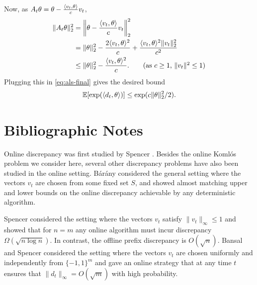 Now, as $A_t \theta = \theta - \frac{\langle v_t,\theta\rangle}{c} v_t$, 
\begin{align*}
    \|A_t \theta \|_2^2  & =  \left\| \theta -  \frac{ \langle v_t,\theta \rangle}{c} v_t \right\|_2^2 \\
    & =  \|\theta\|_2^2 - \frac{2   \langle v_t,\theta \rangle^2}{c} +\frac{\langle v_t,\theta \rangle^2 \|v_t\|_2^2}{c^2} \\
    & \leq  \|\theta\|_2^2 -   \frac{\langle v_t,\theta \rangle^2}{c}.  \tag{as $c \geq 1$, $\|v_t\|^2 \leq 1$}
\end{align*}
Plugging this in \eqref{eq:als-final} gives the desired bound 
\[
 \mathbb{E} [\exp(\langle d_t,\theta \rangle)]  
 \leq \exp ( c \|\theta \|_2^2/2).\]




\section{Bibliographic Notes} 
 Online discrepancy was first studied by Spencer \cite{Spencer77}.
Besides the online Koml\'{o}s problem we consider here, several other discrepancy problems have also been studied in the online setting. 
B\'ar\'any \cite{Barany79} considered the general setting where the vectors $v_t$ are chosen from some fixed set $S$, and showed almost matching upper and lower  bounds on the online discrepancy achievable by any deterministic algorithm.

Spencer \cite{Spencer86Prefix} considered the setting where the vectors $v_t$ satisfy $\|v_t\|_\infty \leq 1$
and showed that for $n=m$ any online algorithm must incur discrepancy $\Omega(\sqrt{n \log n})$. In contrast, the offline  prefix discrepancy is $O(\sqrt{n})$.
Bansal and Spencer \cite{BansalS20} considered the setting where the vectors $v_t$ are chosen uniformly and independently from $\{-1,1\}^m$ and gave an online strategy that at any time $t$ ensures that $\|d_t\|_\infty = O(\sqrt{m})$ with high probability.




